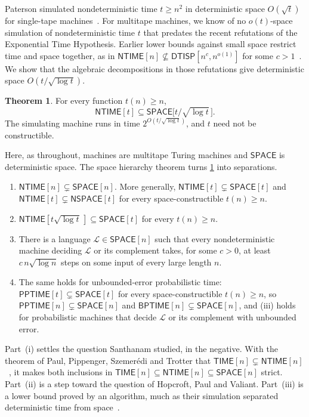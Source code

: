 \documentclass[11pt]{article}
\theoremstyle{definition}
\newtheorem{theorem}{Theorem}[section]
\theoremstyle{definition}
\theoremstyle{remark}
\newcommand{\NTIME}{\mathsf{NTIME}}
\newcommand{\TIME}{\mathsf{TIME}}
\newcommand{\SPACE}{\mathsf{SPACE}}
\newcommand{\NSPACE}{\mathsf{NSPACE}}
\newcommand{\BPTIME}{\mathsf{BPTIME}}
\newcommand{\PPTIME}{\mathsf{PPTIME}}
\begin{document}
Paterson simulated nondeterministic time $t\ge n^2$ in deterministic space $O(\sqrt t)$ for single-tape machines~\cite{Pat72}. For multitape machines, we know of no $o(t)$-space simulation of nondeterministic time $t$ that predates the recent refutations of the Exponential Time Hypothesis. Earlier lower bounds against small space restrict time and space together, as in $\NTIME[n]\not\subseteq\mathsf{DTISP}[n^c,n^{o(1)}]$ for some $c>1$~\cite{vM06}. We show that the algebraic decompositions in those refutations give deterministic space $O(t/\sqrt{\log t})$.

\begin{theorem}\label{thm:main}
For every function $t(n)\ge n$,
\[
\NTIME[t]\subseteq\SPACE\bigl[t/\sqrt{\log t}\,\bigr].
\]
The simulating machine runs in time $2^{O(t/\sqrt{\log t})}$, and $t$ need not be constructible.
\end{theorem}

Here, as throughout, machines are multitape Turing machines and $\SPACE$ is deterministic space. The space hierarchy theorem turns \cref{thm:main} into separations.

\begin{corollary}\label{cor:sep}\leavevmode
\begin{enumerate}[label=(\roman*)]
\item $\NTIME[n]\subsetneq\SPACE[n]$. More generally, $\NTIME[t]\subsetneq\SPACE[t]$ and $\NTIME[t]\subsetneq\NSPACE[t]$ for every space-constructible $t(n)\ge n$.
\item $\NTIME[t\sqrt{\log t}\,]\subseteq\SPACE[t]$ for every $t(n)\ge n$.
\item There is a language $\mathcal L\in\SPACE[n]$ such that every nondeterministic machine deciding $\mathcal L$ or its complement takes, for some $c>0$, at least $c\,n\sqrt{\log n}$ steps on some input of every large length $n$.
\item The same holds for unbounded-error probabilistic time: $\PPTIME[t]\subsetneq\SPACE[t]$ for every space-constructible $t(n)\ge n$, so $\PPTIME[n]\subsetneq\SPACE[n]$ and $\BPTIME[n]\subsetneq\SPACE[n]$, and (iii) holds for probabilistic machines that decide $\mathcal L$ or its complement with unbounded error.
\end{enumerate}
\end{corollary}

Part~(i) settles the question Santhanam studied, in the negative. With the theorem of Paul, Pippenger, Szemer\'edi and Trotter that $\TIME[n]\subsetneq\NTIME[n]$~\cite{PPST83}, it makes both inclusions in $\TIME[n]\subseteq\NTIME[n]\subseteq\SPACE[n]$ strict. Part~(ii) is a step toward the question of Hopcroft, Paul and Valiant. Part~(iii) is a lower bound proved by an algorithm, much as their simulation separated deterministic time from space~\cite{HPV77}.
\end{document}
